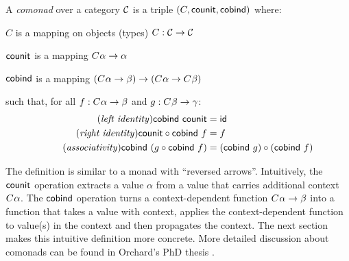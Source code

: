 \begin{definition}
A \emph{comonad} over a category $\mathcal{C}$ is a triple $(C, \textnormal{\sffamily counit}, \textnormal{\sffamily cobind})$ where:
\begin{compactitem}
\item $C$ is a mapping on objects (types) $C : \mathcal{C} \rightarrow \mathcal{C}$
\item $\textnormal{\sffamily counit}$ is a mapping $C^{}\alpha \rightarrow \alpha$ 
\item $\textnormal{\sffamily cobind}$ is a mapping $(C^{}\alpha \rightarrow \beta) 
  \rightarrow (C^{}\alpha \rightarrow C^{}\beta)$
\end{compactitem}
such that, for all $f:C^{}\alpha \rightarrow \beta$ and $g:C^{}\beta \rightarrow \gamma$:
\begin{align}
\tag{\emph{left identity}}
  \ident{cobind}~\ident{counit} &= \idf{}
  \\
\tag{\emph{right identity}}
  \ident{counit} \circ \ident{cobind}~f &= f
  \\
\tag{\emph{associativity}}
  \ident{cobind}~(g \circ \ident{cobind}~f) &= (\ident{cobind}~g) \circ (\ident{cobind}~f)
\end{align}
\end{definition}

\noindent
The definition is similar to a monad with ``reversed arrows''. Intuitively, the $\textnormal{\sffamily counit}$ 
operation extracts a value $\alpha$ from a value that carries additional context $C^{}\alpha$.
The $\textnormal{\sffamily cobind}$ operation turns a context-dependent function 
$C^{}\alpha \rightarrow \beta$ into a function that takes a value with context, applies
the context-dependent function to value(s) in the context and then propagates the context. The 
next section makes this intuitive definition more concrete. More detailed discussion about
comonads can be found in Orchard's PhD thesis \cite{comonads-dom-thesis}.


